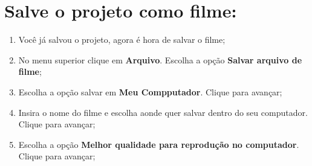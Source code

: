 \documentclass{article}
\begin{document}
\newpage

\section{Salve o projeto como filme:}
\begin{enumerate}
\item Você já salvou o projeto, agora é hora de salvar o filme;
\item No menu superior clique em \textbf{Arquivo}. Escolha a opção \textbf{Salvar arquivo de filme};
\item Escolha a opção salvar em \textbf{Meu Compputador}. Clique para
avançar;
\item Insira o nome do filme e escolha aonde quer salvar dentro do seu computador. Clique para avançar;
\item Escolha a opção \textbf{Melhor qualidade para reprodução no computador}. Clique para avançar;
\end{enumerate}
\end{document}
